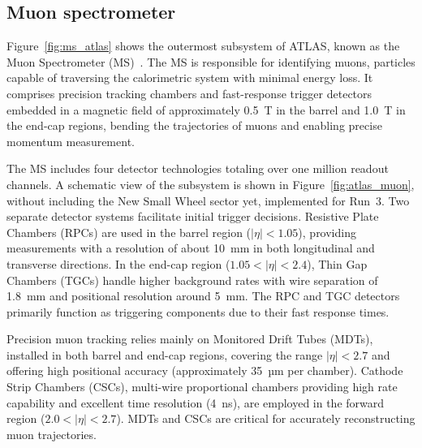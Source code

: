\subsection{Muon spectrometer}
\label{sec:muon}


Figure~\ref{fig:ms_atlas} shows the outermost subsystem of ATLAS, known as the Muon Spectrometer (MS)~\cite{mu_tech}. The MS is responsible for identifying muons, particles capable of traversing the calorimetric system with minimal energy loss. It comprises precision tracking chambers and fast-response trigger detectors embedded in a magnetic field of approximately 0.5~T in the barrel and 1.0~T in the end-cap regions, bending the trajectories of muons and enabling precise momentum measurement.

The MS includes four detector technologies totaling over one million readout channels. A schematic view of the subsystem is shown in Figure~\ref{fig:atlas_muon}, without including the New Small Wheel sector yet, implemented for Run~3. Two separate detector systems facilitate initial trigger decisions. Resistive Plate Chambers (RPCs) are used in the barrel region ($|\eta| < 1.05$), providing measurements with a resolution of about 10~mm in both longitudinal and transverse directions. In the end-cap region ($1.05 < |\eta| < 2.4$), Thin Gap Chambers (TGCs) handle higher background rates with wire separation of 1.8~mm and positional resolution around 5~mm. The RPC and TGC detectors primarily function as triggering components due to their fast response times.

Precision muon tracking relies mainly on Monitored Drift Tubes (MDTs), installed in both barrel and end-cap regions, covering the range $|\eta| < 2.7$ and offering high positional accuracy (approximately 35~µm per chamber). Cathode Strip Chambers (CSCs), multi-wire proportional chambers providing high rate capability and excellent time resolution (4~ns), are employed in the forward region ($2.0 < |\eta| < 2.7$). MDTs and CSCs are critical for accurately reconstructing muon trajectories.

